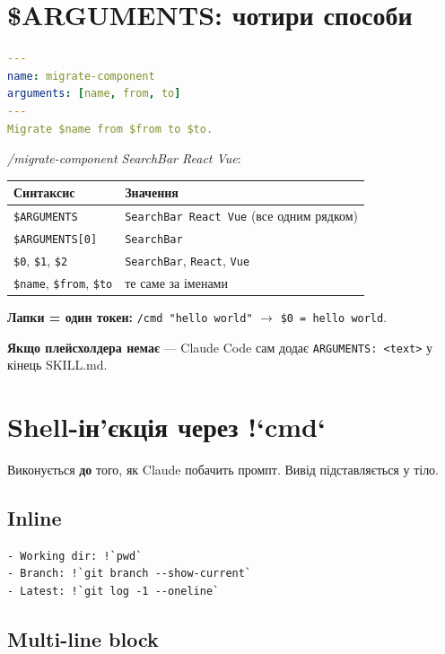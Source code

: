 \documentclass[11pt,a4paper]{article}
\begin{document}
\section{\$ARGUMENTS: чотири способи}

\begin{lstlisting}[language=yaml]
---
name: migrate-component
arguments: [name, from, to]
---
Migrate $name from $from to $to.
\end{lstlisting}

\textit{/migrate-component SearchBar React Vue}:

\begin{tabular}{ll}
\hline
\textbf{Синтаксис} & \textbf{Значення} \\
\hline
\texttt{\$ARGUMENTS} & \texttt{SearchBar React Vue} (все одним рядком) \\
\texttt{\$ARGUMENTS[0]} & \texttt{SearchBar} \\
\texttt{\$0}, \texttt{\$1}, \texttt{\$2} & \texttt{SearchBar}, \texttt{React}, \texttt{Vue} \\
\texttt{\$name}, \texttt{\$from}, \texttt{\$to} & те саме за іменами \\
\hline
\end{tabular}

\textbf{Лапки = один токен:} \texttt{/cmd "hello world"} $\to$ \texttt{\$0 = hello world}.

\textbf{Якщо плейсхолдера немає} --- Claude Code сам додає \texttt{ARGUMENTS: <text>} у кінець SKILL.md.

\section{Shell-ін'єкція через !`cmd`}

Виконується \textbf{до} того, як Claude побачить промпт. Вивід підставляється у тіло.

\subsection{Inline}

\begin{lstlisting}
- Working dir: !`pwd`
- Branch: !`git branch --show-current`
- Latest: !`git log -1 --oneline`
\end{lstlisting}

\subsection{Multi-line block}
\end{document}
